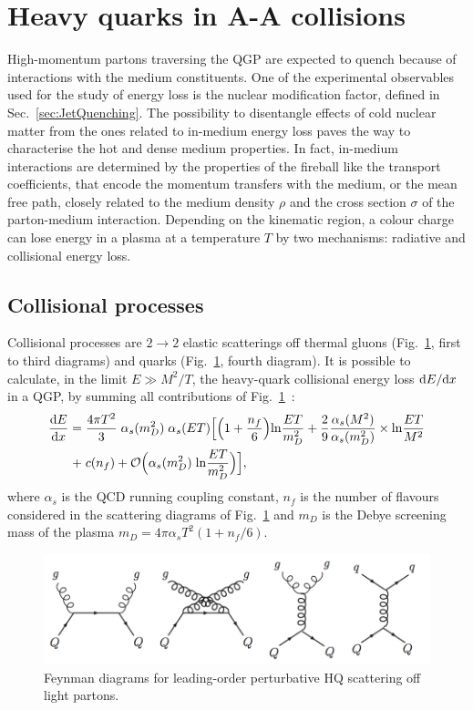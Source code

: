 \section{Heavy quarks in A-A collisions}
\label{sec:HFEnLossinAA}
High-momentum partons traversing the QGP are expected 
to quench because of interactions 
with the medium constituents. One of the experimental observables 
used for the study of energy loss is the 
nuclear modification factor, defined in Sec.~\ref{sec:JetQuenching}. 
The possibility to disentangle
effects of cold nuclear matter from the ones related to in-medium 
energy loss paves the way to characterise the 
hot and dense medium properties. In fact, in-medium interactions are 
determined by the properties of the fireball like the transport coefficients,
that encode the momentum transfers with the medium, or the mean free 
path, closely related to the medium density $\rho$
and the cross section $\sigma$ of the parton-medium interaction. 
Depending on the kinematic region, a colour charge 
can lose energy in a plasma at a temperature $T$ by two mechanisms: 
radiative and collisional energy loss.
\subsection{Collisional processes}
Collisional processes are $2 \rightarrow 2$ elastic scatterings off thermal 
gluons (Fig.~\ref{fig:LoopCollScatt}, first to third diagrams) and quarks 
(Fig.~\ref{fig:LoopCollScatt}, fourth diagram). It is possible to calculate,
 in the limit $E \gg M^2/T$, the heavy-quark collisional energy loss 
 ${\rm d} E/{\rm d} x$ in a QGP, by summing all contributions of 
 Fig.~\ref{fig:LoopCollScatt}~\cite{Peigne:2008nd}:
\begin{equation}
\label{eq:QCDenLossColl}
\begin{split}
\frac{{\rm d} E}{{\rm d} x} = \; & \frac{4 \pi T^2}{3}\;  \alpha_s (m^2_D)\;  \alpha_s(ET) {\Big [} {\Big (}  1 + \frac{n_f}{6}{\Big )} {\rm ln} \frac{ET}{m^2_D} + \frac{2}{9} \frac{\alpha_s(M^2)}{\alpha_s(m^2_D)} \times {\rm ln} \frac{ET}{M^2}  \\+\;  &c(n_f) + \mathcal{O}{\Big (}\alpha_s (m^2_D) \; {\rm ln}\frac{ET}{m^2_D}{\Big )}{\Big ]},
\end{split}
\end{equation}
where $\alpha_s$ is the QCD running coupling constant, $n_f$ is the number of flavours 
considered in the scattering diagrams of Fig.~\ref{fig:LoopCollScatt} and $m_D$ is the 
Debye screening mass of the plasma $m_D = 4\pi \alpha_s T^2 (1 + n_f/6)$. 
\begin{figure}[!ht]
  \centering
  \includegraphics[width=14cm]{FigCap2/LO_HQscattering.png}
  \caption{Feynman diagrams for leading-order perturbative HQ scattering off light partons.}
  \label{fig:LoopCollScatt}
\end{figure}

